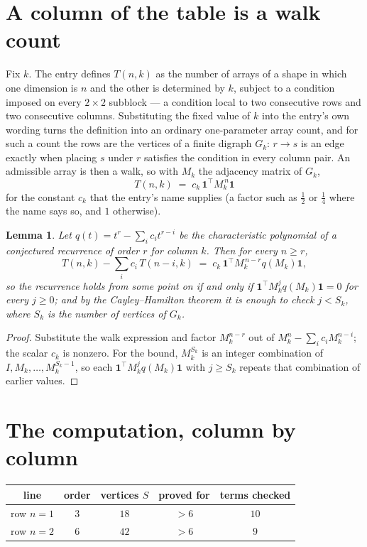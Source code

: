 \documentclass[11pt,a4paper]{article}
\theoremstyle{plain}
\newtheorem{lemma}[theorem]{Lemma}
\theoremstyle{definition}
\begin{document}
\section{A column of the table is a walk count}

Fix $k$. The entry defines $T(n,k)$ as the number of arrays of a shape in which one dimension
is $n$ and the other is determined by $k$, subject to a condition imposed on every
$2\times2$ subblock --- a condition local to two consecutive rows and two consecutive columns.
Substituting the fixed value of $k$ into the entry's own wording turns the definition into an
ordinary one-parameter array count, and for such a count the rows are the vertices of a finite
digraph $G_k$: $r\to s$ is an edge exactly when placing $s$ under $r$ satisfies the condition
in every column pair. An admissible array is then a walk, so with $M_k$ the adjacency matrix
of $G_k$,
\[
T(n,k)\;=\;c_k\,\mathbf{1}^{\!\top}M_k^{\,n}\mathbf{1}
\]
for the constant $c_k$ that the entry's name supplies (a factor such as $\tfrac12$ or
$\tfrac14$ where the name says so, and $1$ otherwise).

\begin{lemma}\label{lem:crit}
Let $q(t)=t^{r}-\sum_i c_it^{r-i}$ be the characteristic polynomial of a conjectured
recurrence of order $r$ for column $k$. Then for every $n\ge r$,
\[
T(n,k)-\sum_i c_i\,T(n-i,k)\;=\;c_k\,\mathbf{1}^{\!\top}M_k^{\,n-r}q(M_k)\mathbf{1},
\]
so the recurrence holds from some point on if and only if
$\mathbf{1}^{\!\top}M_k^{j}q(M_k)\mathbf{1}=0$ for every $j\ge0$; and by the
Cayley--Hamilton theorem it is enough to check $j<S_k$, where $S_k$ is the number of vertices
of $G_k$.
\end{lemma}

\begin{proof}
Substitute the walk expression and factor $M_k^{n-r}$ out of $M_k^{n}-\sum_ic_iM_k^{n-i}$;
the scalar $c_k$ is nonzero. For the bound, $M_k^{S_k}$ is an integer combination of
$I,M_k,\dots,M_k^{S_k-1}$, so each $\mathbf{1}^{\!\top}M_k^{j}q(M_k)\mathbf{1}$ with
$j\ge S_k$ repeats that combination of earlier values.
\end{proof}

\section{The computation, column by column}

\begin{center}
\begin{tabular}{ccccc}
line & order & vertices $S$ & proved for & terms checked \\ \hline
row $n$$=1$ & $3$ & $18$ & $>6$ & $10$ \\
row $n$$=2$ & $6$ & $42$ & $>6$ & $9$ \\
\end{tabular}
\end{center}
\end{document}
